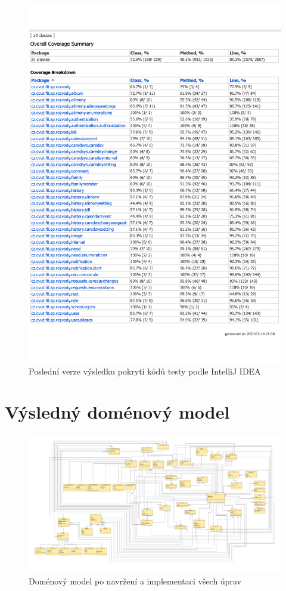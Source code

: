     \begin{figure}\centering
	    \includegraphics[width=1.0\textwidth]{pdfs/IntelliJ-IDEA-coverage-runner-results}
	    \caption[Pokrytí kódů testy podle JaCoCo]{Poslední verze výsledku pokrytí kódů testy podle IntelliJ IDEA}\label{image:intellij-coverage-result}
    \end{figure}
\chapter{Výsledný doménový model}\label{dodatek:DomainModel2}
    \begin{figure}\centering
	    \includegraphics[angle=90, height=1.0\textheight]{pdfs/DomainModel2}
	    \caption[Výsledný doménový model]{Doménový model po navržení a implementaci všech úprav}\label{image:DomainModel2}
    \end{figure}
